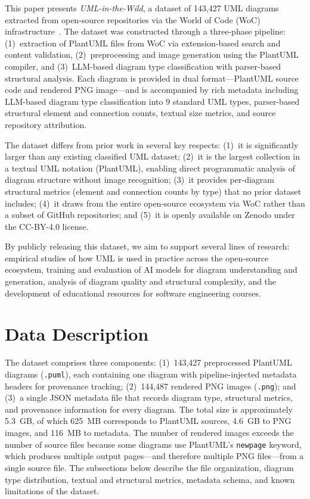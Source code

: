 \documentclass[data,datadescriptor,submit,pdftex,moreauthors]{Definitions/mdpi}
\begin{document}
This paper presents \emph{UML-in-the-Wild}, a dataset of 143,427 UML diagrams extracted from open-source repositories via the World of Code (WoC) infrastructure~\cite{ma2021world}. The dataset was constructed through a three-phase pipeline: (1)~extraction of PlantUML files from WoC via extension-based search and content validation, (2)~preprocessing and image generation using the PlantUML compiler, and (3)~LLM-based diagram type classification with parser-based structural analysis. Each diagram is provided in dual format---PlantUML source code and rendered PNG image---and is accompanied by rich metadata including LLM-based diagram type classification into 9 standard UML types, parser-based structural element and connection counts, textual size metrics, and source repository attribution.

The dataset differs from prior work in several key respects: (1)~it is significantly larger than any existing classified UML dataset; (2)~it is the largest collection in a textual UML notation (PlantUML), enabling direct programmatic analysis of diagram structure without image recognition; (3)~it provides per-diagram structural metrics (element and connection counts by type) that no prior dataset includes; (4)~it draws from the entire open-source ecosystem via WoC rather than a subset of GitHub repositories; and (5)~it is openly available on Zenodo under the CC-BY-4.0 license.

By publicly releasing this dataset, we aim to support several lines of research: empirical studies of how UML is used in practice across the open-source ecosystem, training and evaluation of AI models for diagram understanding and generation, analysis of diagram quality and structural complexity, and the development of educational resources for software engineering courses.

\section{Data Description}
\label{sec:data-description}

The dataset comprises three components: (1)~143,427 preprocessed PlantUML diagrams (\texttt{.puml}), each containing one diagram with pipeline-injected metadata headers for provenance tracking; (2)~144,487 rendered PNG images (\texttt{.png}); and (3)~a single JSON metadata file that records diagram type, structural metrics, and provenance information for every diagram. The total size is approximately 5.3~GB, of which 625~MB corresponds to PlantUML sources, 4.6~GB to PNG images, and 116~MB to metadata. The number of rendered images exceeds the number of source files because some diagrams use PlantUML's \texttt{newpage} keyword, which produces multiple output pages---and therefore multiple PNG files---from a single source file. The subsections below describe the file organization, diagram type distribution, textual and structural metrics, metadata schema, and known limitations of the dataset.
\end{document}
